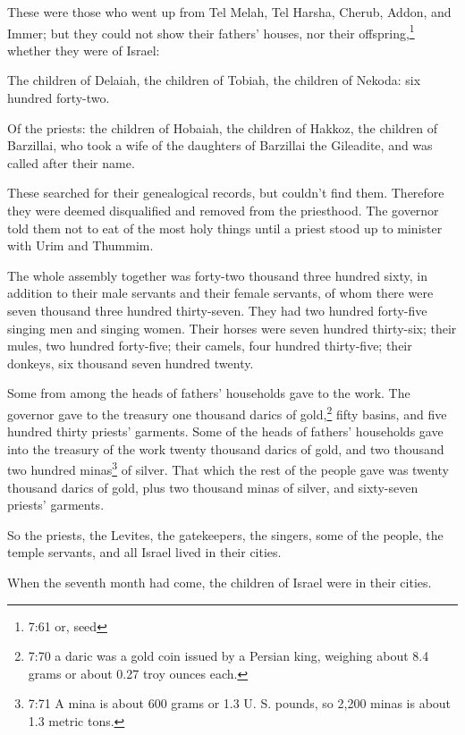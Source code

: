 \myverse{}These were those who went up from Tel Melah, Tel Harsha, Cherub,
Addon, and Immer; but they could not show their fathers’ houses, nor their offspring,\footnote{7:61 or, seed} whether they were of Israel:

\myverse{}The children of Delaiah, the children of Tobiah, the
children of Nekoda: six hundred forty-two.

\myverse{}Of the priests: the children of Hobaiah, the children
of Hakkoz, the children of Barzillai, who took a wife of the daughters of Barzillai the Gileadite, and
was called after their name.

\myverse{}These searched for their genealogical records, but couldn’t find
them. Therefore they were deemed disqualified and removed from the priesthood.
\myverse{}The governor told them not to eat of the most holy things until a priest stood
up to minister with Urim and Thummim.

\myverse{}The whole assembly together was forty-two thousand three hundred
sixty,
\myverse{}in addition to their male servants and their female servants, of whom there
were seven thousand three hundred thirty-seven. They had two hundred forty-five singing men and singing
women.
\myverse{}Their horses were seven hundred thirty-six; their mules, two hundred forty-five;
\myverse{}their camels, four hundred thirty-five; their donkeys, six thousand seven
hundred twenty.

\myverse{}Some from among the heads of fathers’ households gave to the
work. The governor gave to the treasury one thousand darics of gold,\footnote{7:70 a daric was a gold coin issued by a Persian king, weighing about 8.4 grams or about 0.27 troy
	ounces each.} fifty basins, and five hundred thirty priests’ garments.
\myverse{}Some of the heads of fathers’ households gave into the treasury of the work
twenty thousand darics of gold, and two thousand two hundred minas\footnote{7:71 A mina is about 600 grams or 1.3 U. S. pounds, so 2,200 minas is about 1.3 metric tons.}
of silver.
\myverse{}That which the rest of the people gave was twenty thousand darics of gold,
plus two thousand minas of silver, and sixty-seven priests’ garments.

\myverse{}So the priests, the Levites, the gatekeepers, the singers, some
of the people, the temple servants, and all Israel lived in their cities.

When the seventh month had come, the children of Israel were in their cities.


